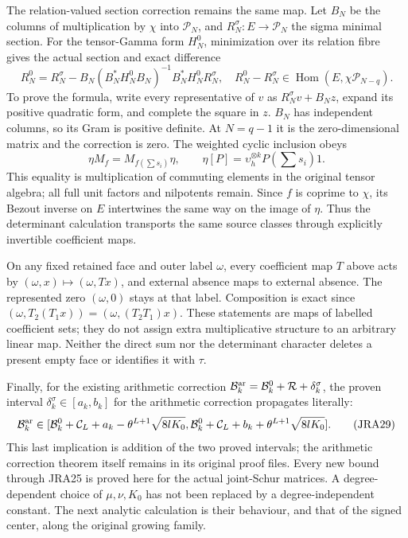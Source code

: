 The relation-valued section correction remains the same map.
Let $B_N$ be the columns of multiplication by $\chi$ into $\mathcal P_N$,
and $R_N^\sigma:E\to\mathcal P_N$ the sigma minimal section.
For the tensor-Gamma form $H_N^0$, minimization over its relation fibre
gives the actual section and exact difference
\begin{equation}
 R_N^0=R_N^\sigma-B_N(B_N^*H_N^0B_N)^{-1}B_N^*H_N^0R_N^\sigma,
 \quad
 R_N^0-R_N^\sigma\in\operatorname{Hom}(E,\chi\mathcal P_{N-q}).
 \tag{JRA27}
\end{equation}
To prove the formula, write every representative of $v$ as
$R_N^\sigma v+B_Nz$, expand its positive quadratic form, and complete
the square in $z$. $B_N$ has independent columns, so its Gram is
positive definite. At $N=q-1$ it is the zero-dimensional matrix and
the correction is zero. The weighted cyclic inclusion obeys
\begin{equation}
 \eta M_f=M_{f(\sum s_i)}\eta,\qquad
 \eta[P]=\upsilon_h^{\otimes k}P(\sum s_i)1.
 \tag{JRA28}
\end{equation}
This equality is multiplication of commuting elements in the original
tensor algebra; all full unit factors and nilpotents remain. Since
$f$ is coprime to $\chi$, its Bezout inverse on $E$ intertwines the same
way on the image of $\eta$. Thus the determinant calculation transports
the same source classes through explicitly invertible coefficient maps.

On any fixed retained face and outer label $\omega$, every coefficient
map $T$ above acts by $(\omega,x)\mapsto(\omega,Tx)$, and external absence
maps to external absence. The represented zero $(\omega,0)$ stays at
that label. Composition is exact since
$(\omega,T_2(T_1x))=(\omega,(T_2T_1)x)$.
These statements are maps of labelled coefficient sets; they do not
assign extra multiplicative structure to an arbitrary linear map.
Neither the direct sum nor the determinant character deletes a
present empty face or identifies it with $\tau$.

Finally, for the existing arithmetic correction
$\mathcal B_k^{\rm ar}=\mathcal B_k^0+\mathcal R+\delta_k^\sigma$,
the proven interval $\delta_k^\sigma\in[a_k,b_k]$ for the arithmetic
correction propagates literally:
\begin{equation}
 \mathcal B_k^{\rm ar}\in
 [\mathcal B_k^0+\mathcal C_L+a_k-\theta^{L+1}\sqrt{8lK_0},
  \mathcal B_k^0+\mathcal C_L+b_k+\theta^{L+1}\sqrt{8lK_0}].
 \tag{JRA29}
\end{equation}
This last implication is addition of the two proved intervals; the
arithmetic correction theorem itself remains in its original proof
files. Every new bound through JRA25 is proved here for the actual
joint-Schur matrices. A degree-dependent choice of $\mu,\nu,K_0$ has
not been replaced by a degree-independent constant. The next analytic
calculation is their behaviour, and that of the signed center, along
the original growing family.

